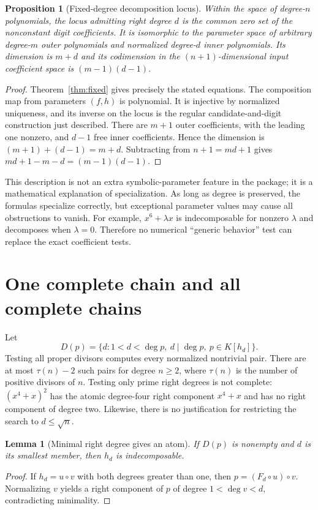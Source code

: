\documentclass[11pt,a4paper]{article}
\numberwithin{equation}{section}
\newtheorem{lemma}[theorem]{Lemma}
\newtheorem{proposition}[theorem]{Proposition}
\theoremstyle{definition}
\theoremstyle{remark}
\begin{document}
\begin{proposition}[Fixed-degree decomposition locus]
\label{prop:locus}
Within the space of degree-$n$ polynomials, the locus admitting right degree
$d$ is the common zero set of the nonconstant digit coefficients. It is
isomorphic to the parameter space of arbitrary degree-$m$ outer polynomials
and normalized degree-$d$ inner polynomials. Its dimension is $m+d$ and its
codimension in the $(n+1)$-dimensional input coefficient space is
$(m-1)(d-1)$.
\end{proposition}
\begin{proof}
Theorem~\ref{thm:fixed} gives precisely the stated equations. The composition
map from parameters $(f,h)$ is polynomial. It is injective by normalized
uniqueness, and its inverse on the locus is the regular candidate-and-digit
construction just described. There are $m+1$ outer coefficients, with the
leading one nonzero, and $d-1$ free inner coefficients. Hence the dimension
is $(m+1)+(d-1)=m+d$. Subtracting from $n+1=md+1$ gives
$md+1-m-d=(m-1)(d-1)$.
\end{proof}

This description is not an extra symbolic-parameter feature in the package;
it is a mathematical explanation of specialization. As long as degree is
preserved, the formulas specialize correctly, but exceptional parameter
values may cause all obstructions to vanish. For example, $x^6+\lambda x$
is indecomposable for nonzero $\lambda$ and decomposes when $\lambda=0$.
Therefore no numerical ``generic behavior'' test can replace the exact
coefficient tests.

\section{One complete chain and all complete chains}
\label{sec:chains}
Let
\[
 D(p)=\{d:1<d<\deg p,\ d\mid\deg p,\
                   p\in K[h_d]\}.
\]
Testing all proper divisors computes every normalized nontrivial pair. There
are at most $\tau(n)-2$ such pairs for degree $n\ge2$, where $\tau(n)$ is the
number of positive divisors of $n$. Testing only prime right degrees is not
complete: $(x^4+x)^2$ has the atomic degree-four right component $x^4+x$ and
has no right component of degree two. Likewise, there is no justification for
restricting the search to $d\le\sqrt n$.

\begin{lemma}[Minimal right degree gives an atom]
\label{lem:minimal}
If $D(p)$ is nonempty and $d$ is its smallest member, then $h_d$ is
indecomposable.
\end{lemma}
\begin{proof}
If $h_d=u\circ v$ with both degrees greater than one, then
$p=(F_d\circ u)\circ v$. Normalizing $v$ yields a right component of $p$ of
degree $1<\deg v<d$, contradicting minimality.
\end{proof}
\end{document}
